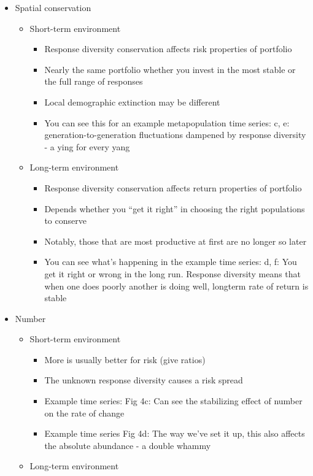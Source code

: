 \begin{itemize}
\itemsep1pt\parskip0pt
\item
  Spatial conservation

  \begin{itemize}
  \itemsep1pt\parskip0pt
  \item
    Short-term environment

    \begin{itemize}
    \itemsep1pt\parskip0pt
    \item
      Response diversity conservation affects risk properties of
      portfolio
    \item
      Nearly the same portfolio whether you invest in the most stable or
      the full range of responses
    \item
      Local demographic extinction may be different
    \item
      You can see this for an example metapopulation time series: c, e:
      generation-to-generation fluctuations dampened by response
      diversity - a ying for every yang
    \end{itemize}
  \item
    Long-term environment

    \begin{itemize}
    \itemsep1pt\parskip0pt
    \item
      Response diversity conservation affects return properties of
      portfolio
    \item
      Depends whether you ``get it right'' in choosing the right
      populations to conserve
    \item
      Notably, those that are most productive at first are no longer so
      later
    \item
      You can see what's happening in the example time series: d, f: You
      get it right or wrong in the long run. Response diversity means
      that when one does poorly another is doing well, longterm rate of
      return is stable
    \end{itemize}
  \end{itemize}
\item
  Number

  \begin{itemize}
  \itemsep1pt\parskip0pt
  \item
    Short-term environment

    \begin{itemize}
    \itemsep1pt\parskip0pt
    \item
      More is usually better for risk (give ratios)
    \item
      The unknown response diversity causes a risk spread
    \item
      Example time series: Fig 4c: Can see the stabilizing effect of
      number on the rate of change
    \item
      Example time series Fig 4d: The way we've set it up, this also
      affects the absolute abundance - a double whammy
    \end{itemize}
  \item
    Long-term environment


\end{itemize}
\end{itemize}
